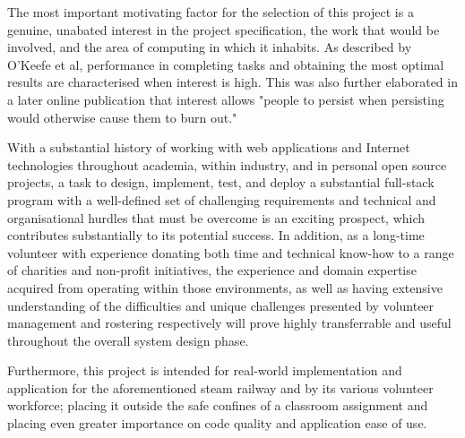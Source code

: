 The most important motivating factor for the selection of this project is a genuine, unabated interest in the project specification, the work that would be involved, and the area of computing in which it inhabits. As described by O'Keefe et al, performance in completing tasks and obtaining the most optimal results are characterised when interest is high. \cite{OKEEFE201470} This was also further elaborated in a later online publication that interest allows "people to persist when persisting would otherwise cause them to burn out." \cite{OKEEFE2014WEB}

With a substantial history of working with web applications and Internet technologies throughout academia, within industry, and in personal open source projects, a task to design, implement, test, and deploy a substantial full-stack program with a well-defined set of challenging requirements and technical and organisational hurdles that must be overcome is an exciting prospect, which contributes substantially to its potential success. In addition, as a long-time volunteer with experience donating both time and technical know-how to a range of charities and non-profit initiatives, the experience and domain expertise acquired from operating within those environments, as well as  having extensive understanding of the difficulties and unique challenges presented by volunteer management and rostering respectively will prove highly transferrable and useful throughout the overall system design phase.

Furthermore, this project is intended for real-world implementation and application for the aforementioned steam railway and by its various volunteer workforce; placing it outside the safe confines of a classroom assignment and placing even greater importance on code quality and application ease of use.
